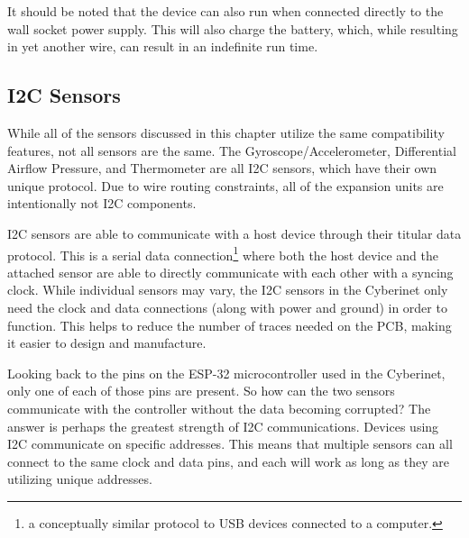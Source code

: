 It should be noted that the device can also run when connected directly to the wall socket power supply. This will also charge the battery, which, while resulting in yet another wire, can result in an indefinite run time.





\subsection{I2C Sensors}
While all of the sensors discussed in this chapter utilize the same compatibility features, not all sensors are the same. The Gyroscope/Accelerometer, Differential Airflow Pressure, and Thermometer are all I2C sensors, which have their own unique protocol. Due to wire routing constraints, all of the expansion units are intentionally not I2C components.

I2C sensors are able to communicate with a host device through their titular data protocol. This is a serial data connection\footnote{a conceptually similar protocol to USB devices connected to a computer.} where both the host device and the attached sensor are able to directly communicate with each other with a syncing clock. While individual sensors may vary, the I2C sensors in the Cyberinet only need the clock and data connections (along with power and ground) in order to function. This helps to reduce the number of traces needed on the PCB, making it easier to design and manufacture.

Looking back to the pins on the ESP-32 microcontroller used in the Cyberinet, only one of each of those pins are present. So how can the two sensors communicate with the controller without the data becoming corrupted? The answer is perhaps the greatest strength of I2C communications. Devices using I2C communicate on specific addresses. This means that multiple sensors can all connect to the same clock and data pins, and each will work as long as they are utilizing unique addresses. 


